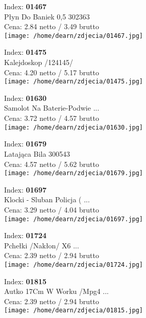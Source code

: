 {Index: \textbf{01467}\\
Płyn Do Baniek 0,5 302363\\
Cena: 2.84 netto / 3.49 brutto\\
  \texttt{[image: /home/dearn/zdjecia/01467.jpg]}}\newline\newline

{Index: \textbf{01475}\\
Kalejdoskop   /124145/\\
Cena: 4.20 netto / 5.17 brutto\\
  \texttt{[image: /home/dearn/zdjecia/01475.jpg]}}\newline\newline

{Index: \textbf{01630}\\
Samolot Na Baterie-Podwie ...\\
Cena: 3.72 netto / 4.57 brutto\\
  \texttt{[image: /home/dearn/zdjecia/01630.jpg]}}\newline\newline

{Index: \textbf{01679}\\
Latająca Bila 300543\\
Cena: 4.57 netto / 5.62 brutto\\
  \texttt{[image: /home/dearn/zdjecia/01679.jpg]}}\newline\newline

{Index: \textbf{01697}\\
Klocki - Sluban Policja ( ...\\
Cena: 3.29 netto / 4.04 brutto\\
  \texttt{[image: /home/dearn/zdjecia/01697.jpg]}}\newline\newline

{Index: \textbf{01724}\\
Pchełki /Nakłon/   X6     ...\\
Cena: 2.39 netto / 2.94 brutto\\
  \texttt{[image: /home/dearn/zdjecia/01724.jpg]}}\newline\newline

{Index: \textbf{01815}\\
Autko 17Cm W Worku  /Mpg4 ...\\
Cena: 2.39 netto / 2.94 brutto\\
  \texttt{[image: /home/dearn/zdjecia/01815.jpg]}}\newline\newline

